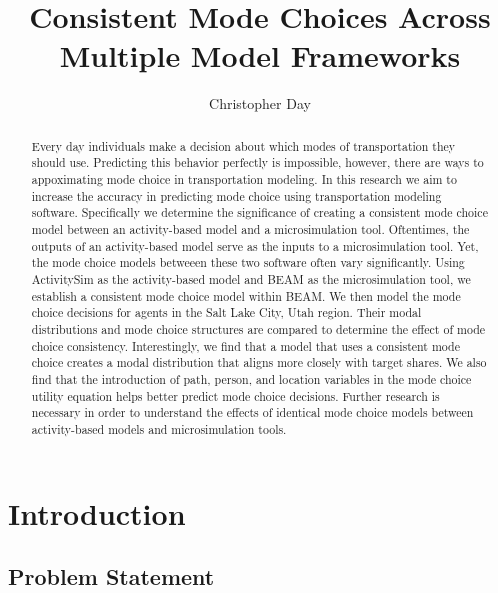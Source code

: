 \documentclass[12pt, oneside, openright]{byuthesis}
\title{Consistent Mode Choices Across\\
Multiple Model Frameworks}
\author{Christopher Day}
\begin{document}
\begin{abstract}
Every day individuals make a decision about which modes of transportation they should use. Predicting this behavior perfectly is impossible, however, there are ways to appoximating mode choice in transportation modeling. In this research we aim to increase the accuracy in predicting mode choice using transportation modeling software. Specifically we determine the significance of creating a consistent mode choice model between an activity-based model and a microsimulation tool. Oftentimes, the outputs of an activity-based model serve as the inputs to a microsimulation tool. Yet, the mode choice models betweeen these two software often vary significantly. Using ActivitySim as the activity-based model and BEAM as the microsimulation tool, we establish a consistent mode choice model within BEAM. We then model the mode choice decisions for agents in the Salt Lake City, Utah region. Their modal distributions and mode choice structures are compared to determine the effect of mode choice consistency. Interestingly, we find that a model that uses a consistent mode choice creates a modal distribution that aligns more closely with target shares. We also find that the introduction of path, person, and location variables in the mode choice utility equation helps better predict mode choice decisions. Further research is necessary in order to understand the effects of identical mode choice models between activity-based models and microsimulation tools.
\end{abstract}


\makefrontmatter %
\thesisbody

\hypertarget{introduction}{%
\chapter{Introduction}\label{introduction}}

\hypertarget{problem-statement}{%
\section{Problem Statement}\label{problem-statement}}
\end{document}
